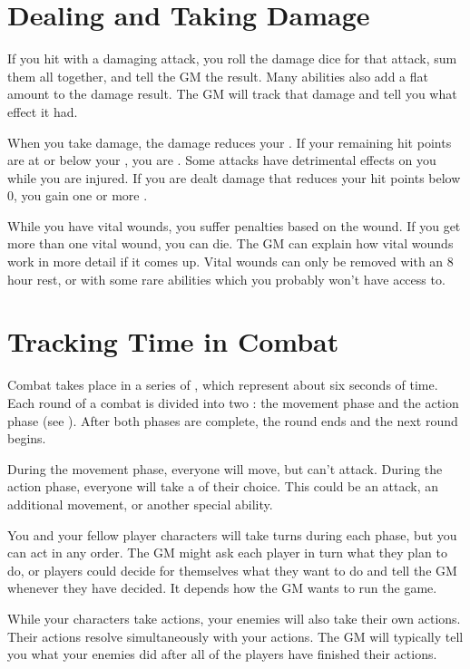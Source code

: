\section{Dealing and Taking Damage}
  If you hit with a damaging attack, you roll the damage dice for that attack, sum them all together, and tell the GM the result.
  Many abilities also add a flat amount to the damage result.
  The GM will track that damage and tell you what effect it had.

  When you take damage, the damage reduces your .
  If your remaining hit points are at or below your , you are .
  Some attacks have detrimental effects on you while you are injured.
  If you are dealt damage that reduces your hit points below 0, you gain one or more .

  While you have vital wounds, you suffer penalties based on the wound.
  If you get more than one vital wound, you can die.
  The GM can explain how vital wounds work in more detail if it comes up.
  Vital wounds can only be removed with an 8 hour rest, or with some rare abilities which you probably won't have access to.

\section{Tracking Time in Combat}
  Combat takes place in a series of , which represent about six seconds of time.
  Each round of a combat is divided into two : the movement phase and the action phase (see ).
  After both phases are complete, the round ends and the next round begins.

  During the movement phase, everyone will move, but can't attack.
  During the action phase, everyone will take a  of their choice.
  This could be an attack, an additional movement, or another special ability.

  You and your fellow player characters will take turns during each phase, but you can act in any order.
  The GM might ask each player in turn what they plan to do, or players could decide for themselves what they want to do and tell the GM whenever they have decided.
  It depends how the GM wants to run the game.

  While your characters take actions, your enemies will also take their own actions.
  Their actions resolve simultaneously with your actions.
  The GM will typically tell you what your enemies did after all of the players have finished their actions.

